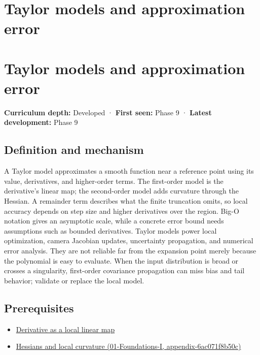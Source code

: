 \hypertarget{appendix-32f39e9a3738}{}
\section*{Taylor models and approximation error}
\section{Taylor models and approximation error}\label{appendix-32f39e9a3738-taylor-models-and-approximation-error}

\textbf{Curriculum depth:} Developed · \textbf{First seen:} Phase 9 · \textbf{Latest development:} Phase 9

\subsection{Definition and mechanism}\label{appendix-32f39e9a3738-definition-and-mechanism}

A Taylor model approximates a smooth function near a reference point using its value, derivatives, and higher-order terms. The first-order model is the derivative's linear map; the second-order model adds curvature through the Hessian. A remainder term describes what the finite truncation omits, so local accuracy depends on step size and higher derivatives over the region. Big-O notation gives an asymptotic scale, while a concrete error bound needs assumptions such as bounded derivatives. Taylor models power local optimization, camera Jacobian updates, uncertainty propagation, and numerical error analysis. They are not reliable far from the expansion point merely because the polynomial is easy to evaluate. When the input distribution is broad or crosses a singularity, first-order covariance propagation can miss bias and tail behavior; validate or replace the local model.

\subsection{Prerequisites}\label{appendix-32f39e9a3738-prerequisites}

\begin{itemize}
\tightlist
\item
  \hyperref[appendix-7bc181935c42]{Derivative as a local linear map}
\item
  \href{../01-Foundations-I/main.pdf\#nameddest=appendix-6ac071f8b50c}{Hessians and local curvature (01-Foundations-I, appendix-6ac071f8b50c)}
\end{itemize}

